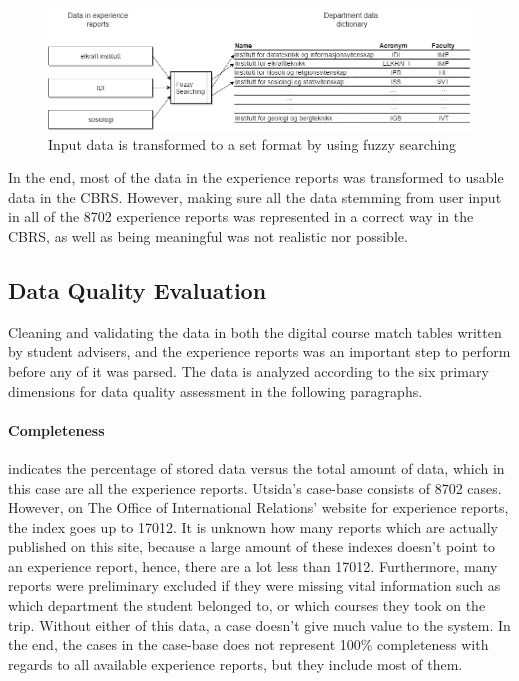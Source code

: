 \begin{figure}[h]
    \centering
    \includegraphics[width=1.0\textwidth]{fig/fuzzy_search.png}
    \caption{Input data is transformed to a set format by using fuzzy searching}
    \label{fig:fuzzy_searching}
\end{figure}

In the end, most of the data in the experience reports was transformed to usable data in the CBRS. However, making sure all the data stemming from user input in all of the 8702 experience reports was represented in a correct way in the CBRS, as well as being meaningful was not realistic nor possible. 

\subsection{Data Quality Evaluation}
Cleaning and validating the data in both the digital course match tables written by student advisers, and the experience reports was an important step to perform before any of it was parsed. The data is analyzed according to the six primary dimensions for data quality assessment\cite{askham2013six} in the following paragraphs.

\paragraph{Completeness} indicates the percentage of stored data versus the total amount of data, which in this case are all the experience reports. Utsida's case-base consists of 8702 cases. However, on The Office of International Relations' website for experience reports, the index goes up to 17012. It is unknown how many reports which are actually published on this site, because a large amount of these indexes doesn't point to an experience report, hence, there are a lot less than 17012. Furthermore, many reports were preliminary excluded if they were missing vital information such as which department the student belonged to, or which courses they took on the trip. Without either of this data, a case doesn't give much value to the system. In the end, the cases in the case-base does not represent 100\% completeness with regards to all available experience reports, but they include most of them.

